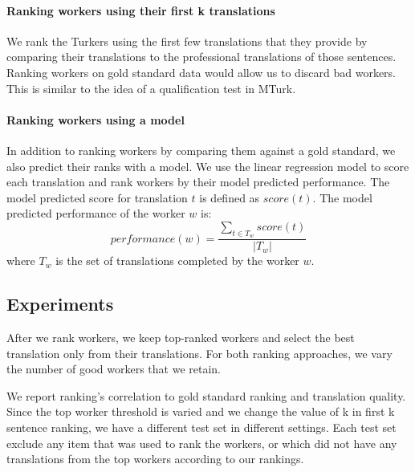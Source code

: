 
\paragraph{Ranking workers using their first k translations}
We rank the Turkers using the first few translations that they provide by comparing their translations to the professional translations of those sentences. Ranking workers on gold standard data would allow us to discard bad workers. This is similar to the idea of a qualification test in MTurk. 

\paragraph{Ranking workers using a model}
In addition to ranking workers by comparing them against a gold standard, we also predict their ranks with a model. 
We use the linear regression model to score each translation and rank workers by their model predicted performance.  
The model predicted score for translation $t$ is defined as $score(t)$. The model predicted performance of the worker $w$ is:
\begin{equation}
performance(w) = \frac{\sum_{t \in T_{w}} score (t)}{|T_{w}|}
\end{equation}
where $T_{w} $ is the set of translations completed by the worker $w$. 
 

\subsection{Experiments}

After we rank workers, we keep top-ranked workers and select the best translation only from their translations. For both ranking approaches, we vary the number of good workers that we retain. 

We report ranking's correlation to gold standard ranking and translation quality. Since the top worker threshold is varied and we change the value of k in first k sentence ranking, we have a different test set in different settings. Each test set exclude any item that was used to rank the workers, or which did not have any translations from the top workers according to our rankings. 

